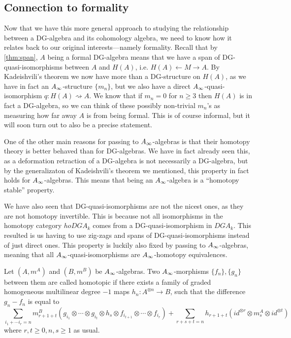 \subsection{Connection to formality}

Now that we have this more general approach to studying the relationship between a DG-algebra and its cohomology algebra, we need to know how it relates back to our original interests---namely formality. Recall that by \cref{thm:span}, $A$ being a formal DG-algebra means that we have a span of DG-quasi-isomorphisms between $A$ and $H(A)$, i.e. $H(A)\longleftarrow M\longrightarrow A$. By Kadeishvili's theorem we now have more than a DG-structure on $H(A)$, as we have in fact an $\A$-structure $\{m_n\}$, but we also have a direct $\A$-quasi-isomorphism $q\colon H(A)\rightsquigarrow A$. We know that if $m_n = 0$ for $n\geq 3$ then $H(A)$ is in fact a DG-algebra, so we can think of these possibly non-trivial $m_n$'s as measuring how far away $A$ is from being formal. This is of course informal, but it will soon turn out to also be a precise statement. 

One of the other main reasons for passing to $\A$-algebras is that their homotopy theory is better behaved than for DG-algebras. We have in fact already seen this, as a deformation retraction of a DG-algebra is not necessarily a DG-algebra, but by the generalizaton of Kadeishvili's theorem we mentioned, this property in fact holds for $\A$-algebras. This means that being an $\A$-algebra is a ``homotopy stable'' property. 

We have also seen that DG-quasi-isomorphisms are not the nicest ones, as they are not homotopy invertible. This is because not all isomorphisms in the homotopy category $hoDGA_k$ comes from a DG-quasi-isomorphism in $DGA_k$. This resulted is us having to use zig-zags and spans of DG-quasi-isomorphisms instead of just direct ones. This property is luckily also fixed by passing to $\A$-algebras, meaning that all $\A$-quasi-isomorphisms are $\A$-homotopy equivalences. 


\begin{definition}[$\A$-homotopy]
\label{def:A_infinity-homotopy}
Let $(A, m^A)$ and $(B, m^B)$ be $\A$-algebras. Two $\A$-morphisms $\{f_n\}, \{g_n\}$ between them are called homotopic if there exists a family of graded homogeneous multilinear degree $-1$ maps $h_n:A^{\otimes n}\longrightarrow B$, such that the difference $g_n-f_n$ is equal to
\begin{equation*}
\sum_{i_1+\cdots i_r = n}m^B_{r+1+t} (g_{i_1}\otimes \cdots \otimes g_{i_t}\otimes h_s \otimes f_{i_{t+1}}\otimes \cdots \otimes f_{i_r} ) + \sum_{r+s+t = n}h_{r+1+t} (id^{\otimes r}\otimes m^A_s \otimes id^{\otimes t})
\end{equation*}
where $r, t\geq 0, n, s\geq 1$ as usual. 
\end{definition}


